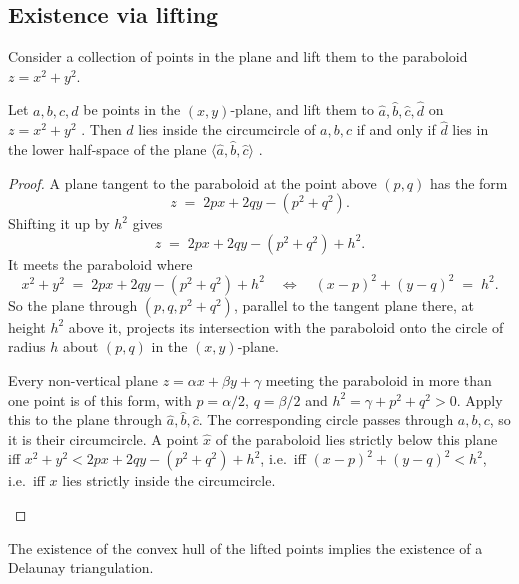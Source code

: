 \subsection{Existence via lifting}

Consider a collection of points in the plane and lift them to the paraboloid
$z=x^2+y^2$.

\begin{lemma}
\label{L1:lem:lifting}
Let $a,b,c,d$ be points in the $(x,y)$-plane, and lift them to
$\hat a,\hat b,\hat c,\hat d$ on $z=x^2+y^2$ . Then $d$ lies
inside the circumcircle of $a,b,c$ if and only if $\hat d$ lies in the lower half-space of the
plane $\langle\hat a,\hat b,\hat c\rangle$ .
\end{lemma}

\begin{proof}
A plane tangent to the paraboloid at the point above $(p,q)$ has the form
\[
  z\;=\;2px+2qy-(p^2+q^2).
\]
Shifting it up by $h^2$ gives
\[
  z\;=\;2px+2qy-(p^2+q^2)+h^2 .
\]
It meets the paraboloid where
\[
  x^2+y^2\;=\;2px+2qy-(p^2+q^2)+h^2
  \quad\Longleftrightarrow\quad (x-p)^2+(y-q)^2\;=\;h^2 .
\]
So the plane through $(p,q,p^2+q^2)$, parallel to the tangent plane there, at height $h^2$
above it, projects its intersection with the paraboloid onto the circle of radius $h$
about $(p,q)$ in the $(x,y)$-plane.
\begin{addedblock}
Every non-vertical plane $z=\alpha x+\beta y+\gamma$ meeting the paraboloid in more than one point
is of this form, with $p=\alpha/2$, $q=\beta/2$ and $h^2=\gamma+p^2+q^2>0$. Apply this to the plane
through $\hat a,\hat b,\hat c$. The corresponding circle passes through $a,b,c$, so it is their
circumcircle. A point $\hat x$ of the paraboloid lies strictly below this plane iff
$x^2+y^2<2px+2qy-(p^2+q^2)+h^2$, i.e.\ iff $(x-p)^2+(y-q)^2<h^2$, i.e.\ iff $x$ lies strictly
inside the circumcircle.
\end{addedblock}
\end{proof}

\begin{corollary}
\label{L1:cor:delaunay-exists}
The existence of the convex hull of the lifted points implies the existence of a Delaunay triangulation.
\end{corollary}

